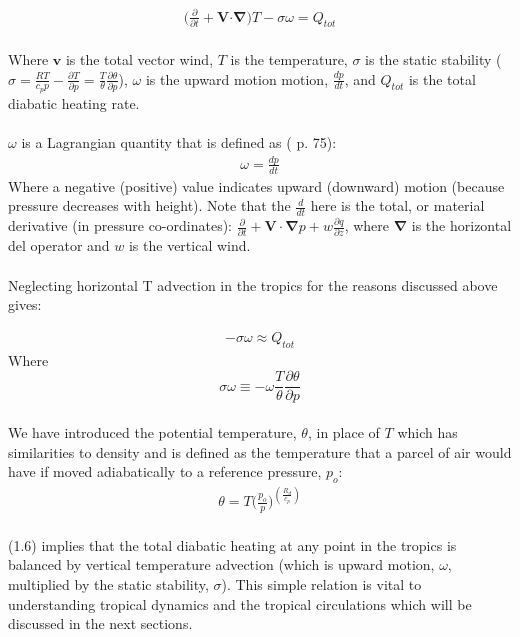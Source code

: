 \documentclass[letterpaper,12pt,titlepage,oneside,final]{book}
\begin{document}
\begin{align}
\Big(\frac{\partial}{\partial{t}}+\mathbf{V}\boldsymbol{\cdot} \mathbf{\nabla}\Big)T - \sigma\omega =Q_{tot}
\end{align}
\\
Where $\mathbf{v}$ is the total vector wind, $T$ is the temperature, $\sigma$ is the static stability ($\sigma=\frac{RT}{c_{p}p} - \frac{\partial{T}}{\partial{p}} = \frac{T}{\theta}\frac{\partial{\theta}}{\partial{p}}$), $\omega$ is the upward motion motion, $\frac{dp}{dt}$, and $Q_{tot}$ is the total diabatic heating rate. 
\\
\\
$\omega$ is a Lagrangian quantity that is defined as (\cite{holton_introduction_2004} p. 75):
\begin{align}\label{omega}
\omega=\frac{dp}{dt}
\end{align}
Where a negative (positive) value indicates upward (downward) motion (because pressure decreases with height). Note that the $\frac{d}{dt}$ here is the total, or material derivative (in pressure co-ordinates): $\frac{\partial}{\partial{t}} + \mathbf{V}\cdot\mathbf{\nabla}p + w\frac{\partial{q}}{\partial{z}}$, where $\mathbf{\nabla}$ is the horizontal del operator and $w$ is the vertical wind.
\\
\\
Neglecting horizontal T advection in the tropics for the reasons discussed above gives:

\begin{align}
-\sigma\omega \approx{Q_{tot}}
\end{align}
Where
\begin{equation}\label{eq:sp}
  \sigma\omega\equiv-\omega\frac{T}{\theta}\frac{\partial{\theta}}{\partial{p}}
\end{equation}
\\
We have introduced the potential temperature, $\theta$, in place of $T$ which has similarities to density and is defined as the temperature that a parcel of air would have if moved adiabatically to a reference pressure, $p_{o}$:
\begin{align}
\theta=T\Big(\frac{p_{o}}{p}\Big)^{(\frac{R_{d}}{c_{p}})}
\end{align}
\\
(1.6) implies that the total diabatic heating at any point in the tropics is balanced by vertical temperature advection (which is upward motion, $\omega$, multiplied by the static stability, $\sigma$).
This simple relation is vital to understanding tropical dynamics and the tropical circulations which will be discussed in the next sections.
\end{document}
